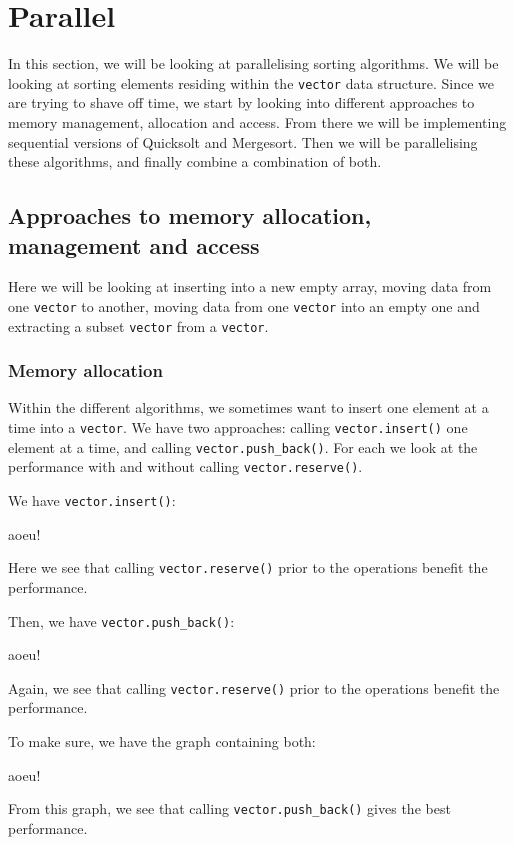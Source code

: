 \section{Parallel}
In this section, we will be looking at parallelising sorting algorithms. We
will be looking at sorting elements residing within the \texttt{vector} data
structure. Since we are trying to shave off time, we start by looking into
different approaches to memory management, allocation and access. From there we
will be implementing sequential versions of Quicksolt and Mergesort. Then we
will be parallelising these algorithms, and finally combine a combination of
both.

\subsection{Approaches to memory allocation, management and access}
Here we will be looking at inserting into a new empty array, moving data from
one \texttt{vector} to another, moving data from one \texttt{vector} into an
empty one and extracting a subset \texttt{vector} from a \texttt{vector}.

\subsubsection{Memory allocation}
Within the different algorithms, we sometimes want to insert one element at a
time into a \texttt{vector}. We have two approaches: calling \texttt{vector.insert()}
one element at a time, and calling \texttt{vector.push\_back()}. For each we look at
the performance with and without calling \texttt{vector.reserve()}.

We have \texttt{vector.insert()}:
\begin{center}
aoeu!
\end{center}
Here we see that calling \texttt{vector.reserve()} prior to the operations benefit the
performance.

Then, we have \texttt{vector.push\_back()}:
\begin{center}
aoeu!
\end{center}
Again, we see that calling \texttt{vector.reserve()} prior to the operations benefit the
performance.

To make sure, we have the graph containing both:
\begin{center}
aoeu!
\end{center}
From this graph, we see that calling \texttt{vector.push\_back()} gives the
best performance.

